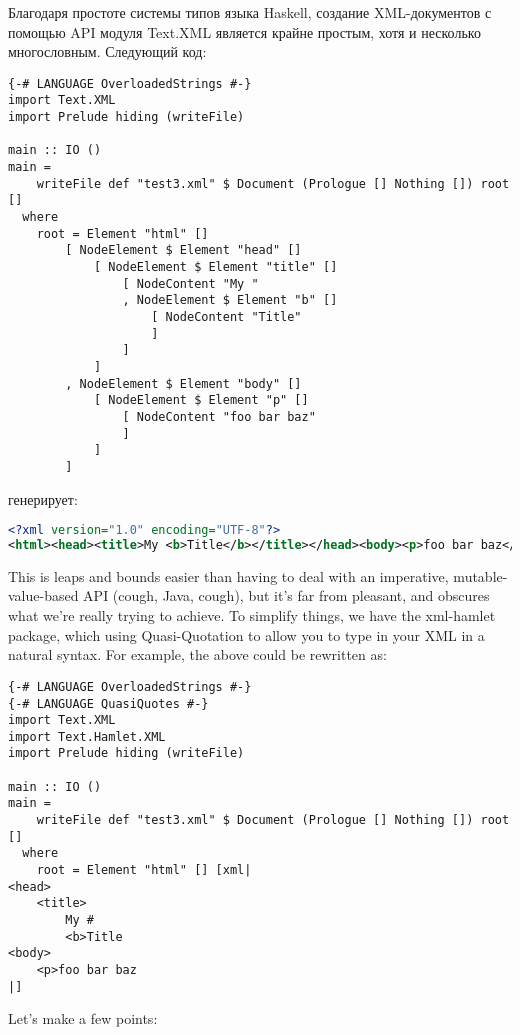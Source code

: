 Благодаря простоте системы типов языка Haskell, создание XML-документов с помощью API модуля Text.XML является крайне простым, хотя и несколько многословным. Следующий код:

\begin{lstlisting}
{-# LANGUAGE OverloadedStrings #-}
import Text.XML
import Prelude hiding (writeFile)

main :: IO ()
main =
    writeFile def "test3.xml" $ Document (Prologue [] Nothing []) root []
  where
    root = Element "html" []
        [ NodeElement $ Element "head" []
            [ NodeElement $ Element "title" []
                [ NodeContent "My "
                , NodeElement $ Element "b" []
                    [ NodeContent "Title"
                    ]
                ]
            ]
        , NodeElement $ Element "body" []
            [ NodeElement $ Element "p" []
                [ NodeContent "foo bar baz"
                ]
            ]
        ]
\end{lstlisting}

генерирует:

\begin{lstlisting}[language=XML]
<?xml version="1.0" encoding="UTF-8"?>
<html><head><title>My <b>Title</b></title></head><body><p>foo bar baz</p></body></html>
\end{lstlisting}

This is leaps and bounds easier than having to deal with an imperative, mutable-value-based API (cough, Java, cough), but it's far from pleasant, and obscures what we're really trying to achieve. To simplify things, we have the xml-hamlet package, which using Quasi-Quotation to allow you to type in your XML in a natural syntax. For example, the above could be rewritten as:

\begin{lstlisting}
{-# LANGUAGE OverloadedStrings #-}
{-# LANGUAGE QuasiQuotes #-}
import Text.XML
import Text.Hamlet.XML
import Prelude hiding (writeFile)

main :: IO ()
main =
    writeFile def "test3.xml" $ Document (Prologue [] Nothing []) root []
  where
    root = Element "html" [] [xml|
<head>
    <title>
        My #
        <b>Title
<body>
    <p>foo bar baz
|]
\end{lstlisting}%

Let's make a few points:


